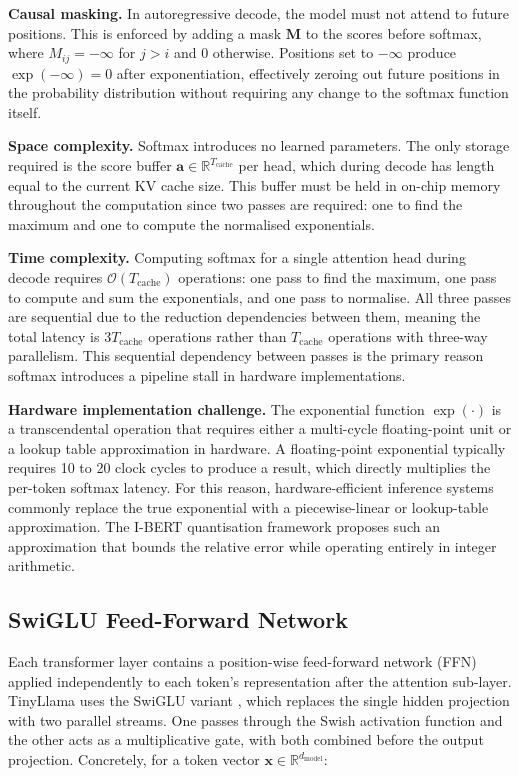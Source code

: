 \noindent\textbf{Causal masking.} In autoregressive decode, the model must
not attend to future positions. This is enforced by adding a mask
$\mathbf{M}$ to the scores before softmax, where $M_{ij} = -\infty$ for
$j > i$ and $0$ otherwise. Positions set to $-\infty$ produce
$\exp(-\infty) = 0$ after exponentiation, effectively zeroing out future
positions in the probability distribution without requiring any change to
the softmax function itself.

\noindent\textbf{Space complexity.} Softmax introduces no learned
parameters. The only storage required is the score buffer
$\mathbf{a} \in \mathbb{R}^{T_{\text{cache}}}$ per head, which during
decode has length equal to the current KV cache size. This buffer must
be held in on-chip memory throughout the computation since two passes are
required: one to find the maximum and one to compute the normalised
exponentials.

\noindent\textbf{Time complexity.} Computing softmax for a single
attention head during decode requires
$\mathcal{O}(T_{\text{cache}})$ operations: one pass to find the maximum,
one pass to compute and sum the exponentials, and one pass to normalise.
All three passes are sequential due to the reduction dependencies between
them, meaning the total latency is $3T_{\text{cache}}$ operations rather
than $T_{\text{cache}}$ operations with three-way parallelism. This
sequential dependency between passes is the primary reason softmax
introduces a pipeline stall in hardware implementations.

\noindent\textbf{Hardware implementation challenge.} The exponential
function $\exp(\cdot)$ is a transcendental operation that requires either
a multi-cycle floating-point unit or a lookup table approximation in
hardware. A floating-point exponential typically requires 10 to 20 clock
cycles to produce a result, which directly multiplies the per-token
softmax latency. For this reason, hardware-efficient inference systems
commonly replace the true exponential with a piecewise-linear or
lookup-table approximation. The I-BERT quantisation framework
\cite{kim2021ibert} proposes such an approximation that bounds the
relative error while operating entirely in integer arithmetic.

\subsection{SwiGLU Feed-Forward Network}
\label{subsec:swiglu}

Each transformer layer contains a position-wise feed-forward network (FFN)
applied independently to each token's representation after the attention
sub-layer. TinyLlama uses the SwiGLU variant \cite{shazeer2020glu}, 
which replaces the single hidden projection with two parallel streams. One
passes through the Swish activation function and the other acts as a
multiplicative gate, with both combined before the output projection. Concretely, for a token vector
$\mathbf{x} \in \mathbb{R}^{d_{\text{model}}}$:

